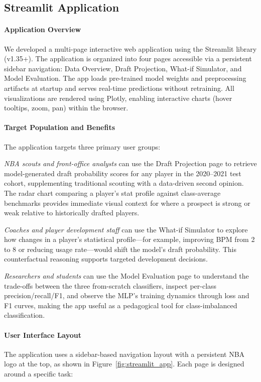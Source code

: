 \subsection{Streamlit Application}

\paragraph{Application Overview}
We developed a multi-page interactive web application using the Streamlit library (v1.35+). The application is organized into four pages accessible via a persistent sidebar navigation: Data Overview, Draft Projection, What-if Simulator, and Model Evaluation. The app loads pre-trained model weights and preprocessing artifacts at startup and serves real-time predictions without retraining. All visualizations are rendered using Plotly, enabling interactive charts (hover tooltips, zoom, pan) within the browser.

\paragraph{Target Population and Benefits}
The application targets three primary user groups:

\textit{NBA scouts and front-office analysts} can use the Draft Projection page to retrieve model-generated draft probability scores for any player in the 2020--2021 test cohort, supplementing traditional scouting with a data-driven second opinion. The radar chart comparing a player's stat profile against class-average benchmarks provides immediate visual context for where a prospect is strong or weak relative to historically drafted players.

\textit{Coaches and player development staff} can use the What-if Simulator to explore how changes in a player's statistical profile---for example, improving BPM from 2 to 8 or reducing usage rate---would shift the model's draft probability. This counterfactual reasoning supports targeted development decisions.

\textit{Researchers and students} can use the Model Evaluation page to understand the trade-offs between the three from-scratch classifiers, inspect per-class precision/recall/F1, and observe the MLP's training dynamics through loss and F1 curves, making the app useful as a pedagogical tool for class-imbalanced classification.

\paragraph{User Interface Layout}
The application uses a sidebar-based navigation layout with a persistent NBA logo at the top, as shown in Figure~\ref{fig:streamlit_app}. Each page is designed around a specific task:

